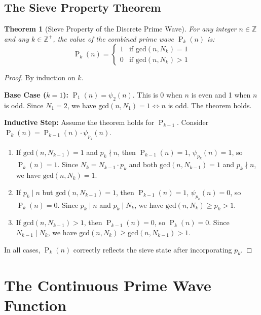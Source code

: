 ﻿\documentclass[12pt,a4paper]{report}
\theoremstyle{plain}
\newtheorem{theorem}{Theorem}[section]
\theoremstyle{definition}
\newcommand{\Z}{\mathbb{Z}}
\renewcommand{\gcd}{\text{gcd}}
\DeclareMathOperator{\Pk}{P}
\begin{document}
\section{The Sieve Property Theorem}

\begin{theorem}[Sieve Property of the Discrete Prime Wave]
\label{thm:sieve_property}
For any integer $n \in \Z$ and any $k \in \Z^+$, the value of the combined prime wave $\Pk_k(n)$ is:
\[
\Pk_k(n) = \begin{cases}
1 & \text{if } \gcd(n, N_k) = 1 \\
0 & \text{if } \gcd(n, N_k) > 1
\end{cases}
\]
\end{theorem}

\begin{proof}
By induction on $k$.

\textbf{Base Case ($k=1$):} $\Pk_1(n) = \psi_2(n)$. This is 0 when $n$ is even and 1 when $n$ is odd. Since $N_1 = 2$, we have $\gcd(n, N_1) = 1 \iff n$ is odd. The theorem holds.

\textbf{Inductive Step:} Assume the theorem holds for $\Pk_{k-1}$. Consider $\Pk_k(n) = \Pk_{k-1}(n) \cdot \psi_{p_k}(n)$.

\begin{enumerate}
    \item If $\gcd(n, N_{k-1}) = 1$ and $p_k \nmid n$, then $\Pk_{k-1}(n) = 1$, $\psi_{p_k}(n) = 1$, so $\Pk_k(n) = 1$. Since $N_k = N_{k-1} \cdot p_k$ and both $\gcd(n, N_{k-1}) = 1$ and $p_k \nmid n$, we have $\gcd(n, N_k) = 1$.
    
    \item If $p_k \mid n$ but $\gcd(n, N_{k-1}) = 1$, then $\Pk_{k-1}(n) = 1$, $\psi_{p_k}(n) = 0$, so $\Pk_k(n) = 0$. Since $p_k \mid n$ and $p_k \mid N_k$, we have $\gcd(n, N_k) \geq p_k > 1$.
    
    \item If $\gcd(n, N_{k-1}) > 1$, then $\Pk_{k-1}(n) = 0$, so $\Pk_k(n) = 0$. Since $N_{k-1} \mid N_k$, we have $\gcd(n, N_k) \geq \gcd(n, N_{k-1}) > 1$.
\end{enumerate}

In all cases, $\Pk_k(n)$ correctly reflects the sieve state after incorporating $p_k$.
\end{proof}

\chapter{The Continuous Prime Wave Function}
\label{ch:continuous}
\end{document}
